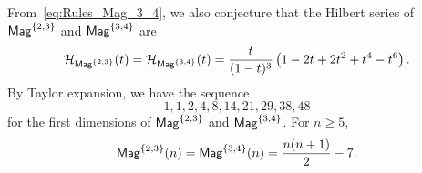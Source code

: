 From~\eqref{eq:Rules_Mag_3_4}, we also conjecture that the Hilbert
series of $\mathsf{Mag}^{\{2, 3\}}$ and $\mathsf{Mag}^{\{3, 4\}}$ are
\begin{equation}
    \mathcal{H}_{\mathsf{Mag}^{\{2, 3\}}}(t) =
    \mathcal{H}_{\mathsf{Mag}^{\{3, 4\}}}(t) =
    \frac{t}{(1 - t)^3}
    \left(1 - 2t + 2t^2 + t^4 - t^6\right).
\end{equation}
By Taylor expansion, we have the sequence
\begin{equation}
    1, 1, 2, 4, 8, 14, 21, 29, 38, 48
\end{equation}
for the first dimensions of $\mathsf{Mag}^{\{2, 3\}}$ and $\mathsf{Mag}^{\{3, 4\}}$.
For $n \geq 5$,
\begin{equation}
    \mathsf{Mag}^{\{2, 3\}}(n) =\mathsf{Mag}^{\{3, 4\}}(n) = \frac{n(n+1)}{2} - 7.
\end{equation}
\medbreak

